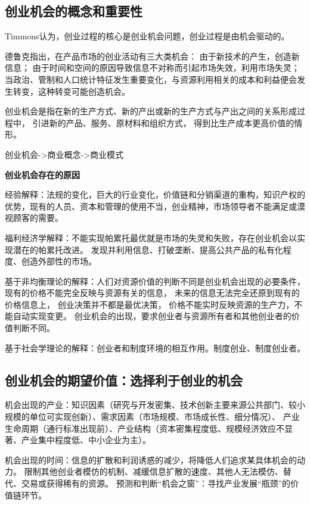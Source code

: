 \documentclass[a4paper, UTF8]{ctexart}
\begin{document}
	\subsection{创业机会的概念和重要性}
		Timmons认为，创业过程的核心是创业机会问题，创业过程是由机会驱动的。

		德鲁克指出，在产品市场的创业活动有三大类机会：
		由于新技术的产生，创造新信息；
		由于时间和空间的原因导致信息不对称而引起市场失效，利用市场失灵；
		当政治、管制和人口统计特征发生重要变化，与资源利用相关的成本和利益便会发生转变，这种转变可能创造机会。

		创业机会是指在新的生产方式、新的产出或新的生产方式与产出之间的关系形成过程中，
		引进新的产品、服务、原材料和组织方式，
		得到比生产成本更高价值的情形。

		创业机会->商业概念->商业模式

		\textbf{创业机会存在的原因}
		
		经验解释：法规的变化，巨大的行业变化，价值链和分销渠道的重构，知识产权的优势，现有的人员、资本和管理的使用不当，创业精神，市场领导者不能满足或漠视顾客的需要。

		福利经济学解释：不能实现帕累托最优就是市场的失灵和失败，存在创业机会以实现潜在的帕累托改进。
		发现并利用信息、打破垄断、提高公共产品的私有化程度、创造外部性的市场。

		基于非均衡理论的解释：人们对资源价值的判断不同是创业机会出现的必要条件，
		现有的价格不能完全反映与资源有关的信息，
		未来的信息无法完全还原到现有的价格信息上，
		创业决策并不都是最优决策，
		价格不能实时反映资源的生产力，不能自动实现变更。
		创业机会的出现，要求创业者与资源所有者和其他创业者的价值判断不同。

		基于社会学理论的解释：创业者和制度环境的相互作用。制度创业、制度创业者。

	\subsection{创业机会的期望价值：选择利于创业的机会}
		机会出现的产业：知识因素（研究与开发密集、技术创新主要来源公共部门、较小规模的单位可实现创新）、需求因素（市场规模、市场成长性、细分情况）、
		产业生命周期（通行标准出现前）、产业结构（资本密集程度低、规模经济效应不显著、产业集中程度低、中小企业为主）。

		机会出现的时间：信息的扩散和利润诱惑的减少，将降低人们追求某具体机会的动力。
		限制其他创业者模仿的机制、减缓信息扩散的速度、其他人无法模仿、替代、交易或获得稀有的资源。
		预测和判断“机会之窗”：寻找产业发展“瓶颈”的价值链环节。
\end{document}
